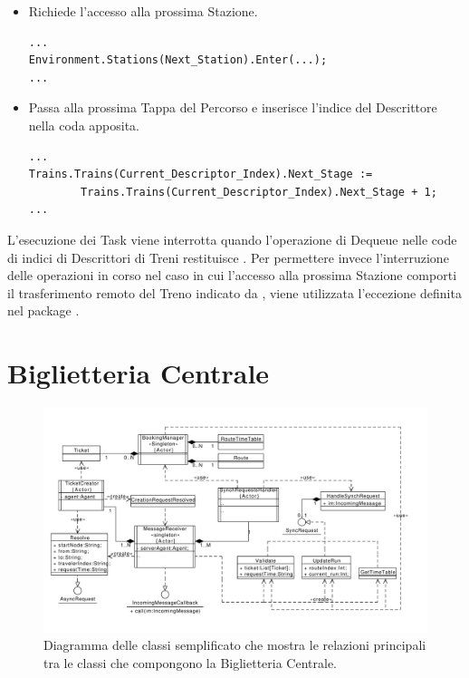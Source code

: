 \begin{itemize}
		\item Richiede l'accesso alla prossima Stazione.

\begin{lstlisting}
...
Environment.Stations(Next_Station).Enter(...);
...
\end{lstlisting}		

		\item Passa alla prossima Tappa del Percorso e inserisce l'indice del Descrittore nella coda apposita.

\begin{lstlisting}
...
Trains.Trains(Current_Descriptor_Index).Next_Stage := 
		Trains.Trains(Current_Descriptor_Index).Next_Stage + 1;
...
\end{lstlisting}

	\end{itemize}
	
	L'esecuzione dei Task viene interrotta quando l'operazione di Dequeue nelle code di indici di Descrittori di Treni restituisce . Per permettere invece l'interruzione delle operazioni in corso nel caso in cui l'accesso alla prossima Stazione comporti il trasferimento remoto del Treno indicato da , viene utilizzata l'eccezione  definita nel package .
	
	
	

	
	
		
	
		
	
		
	
	\newpage
	\section{Biglietteria Centrale}
	
	\begin{figure}[htbp]
		\includegraphics[scale=0.5,trim= 35mm 0mm 0mm 0mm]{imgs/ticket_office_class.pdf}
		\caption{\footnotesize{Diagramma delle classi semplificato che mostra le relazioni principali tra le classi che compongono la Biglietteria Centrale.}}
		\label{img:ticket_office_class_diagram}
	\end{figure}
	
